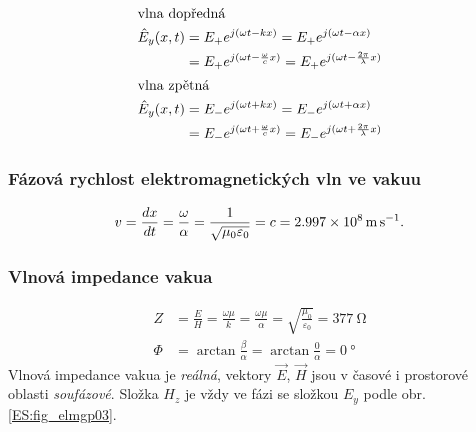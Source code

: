         \begin{subequations}
          \begin{align}
            \shortintertext{vlna dopředná}
            \hat{E}_y(x,t) 
              &= E_+e^{j(\omega t - kx)} 
               = E_+e^{j(\omega t - \alpha x)}                    \nonumber \\
              &= E_+e^{j(\omega t - \frac{\omega}{c}x)}
               = E_+e^{j(\omega t - \frac{2\pi}{\lambda}x)}       \label{ES:eq_elmagp38a}   \\
            \shortintertext{vlna zpětná}
            \hat{E}_y(x,t) 
              &= E_-e^{j(\omega t + kx)}
               = E_-e^{j(\omega t + \alpha x)}                    \nonumber \\
              &= E_-e^{j(\omega t + \frac{\omega}{c}x)} 
               = E_-e^{j(\omega t + \frac{2\pi}{\lambda}x)}       \label{ES:eq_elmagp38b}
          \end{align}
        \end{subequations}

      \subsubsection{Fázová rychlost elektromagnetických vln ve vakuu}
        \begin{equation}\label{ES:eq_elmagp39}
          v = \dfrac{d x}{d t} = \frac{\omega}{\alpha} = \frac{1}{\sqrt{\mu_0\varepsilon_0}}
            = c 
            = \SI{2.997e8}{\meter\per\second}.
        \end{equation}

      \subsubsection{Vlnová impedance vakua}
        \begin{align}
             Z &= \frac{E}{H} = \frac{\omega\mu}{k} 
                = \frac{\omega\mu}{\alpha} 
                = \sqrt{\frac{\mu_0}{\varepsilon_0}} = \SI{377}{\ohm}  \label{ES:eq_elmagp40a} \\
          \Phi &= \arctan\frac{\beta}{\alpha} 
                = \arctan\frac{0}{\alpha} = \SI{0}{\degree}            \label{ES:eq_elmagp40b} 
        \end{align}
        Vlnová impedance vakua je \emph{reálná}, vektory \(\vec{E}\), \(\vec{H}\) jsou v časové i 
        prostorové oblasti \emph{soufázové}. Složka \(H_z\) je vždy ve fázi se složkou \(E_y\) 
        podle obr. \ref{ES:fig_elmgp03}.

